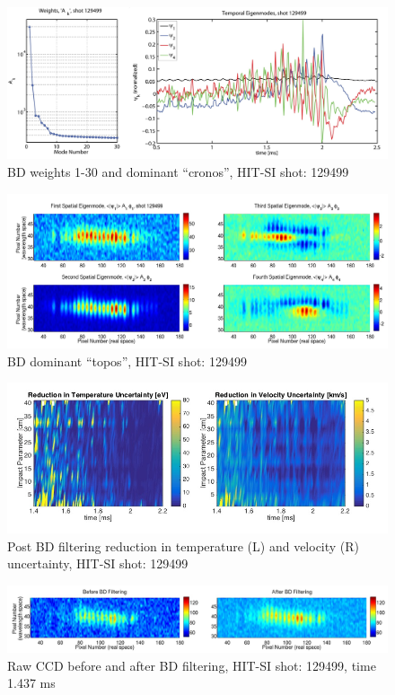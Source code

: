\documentclass{AIAA}
\begin{document}
\begin{center}
\begin{figure}
\includegraphics[width=6in]{BDWeight}\caption{BD weights 1-30 and dominant ``cronos'', HIT-SI shot: 129499}\label{BD Weight}
\end{figure}
\begin{figure}
\includegraphics[width=6in]{BDTopos}\caption{BD dominant ``topos'', HIT-SI shot: 129499}\label{BD Topos}
\end{figure}
\begin{figure}
\includegraphics[width=6in]{BD_Uncertainty}\caption{Post BD filtering reduction in temperature (L) and velocity (R) uncertainty, HIT-SI shot: 129499}\label{BD Uncertainty}
\end{figure}
\begin{figure}
\includegraphics[width=6in]{CCD_BD}\caption{Raw CCD before and after BD filtering, HIT-SI shot: 129499, time 1.437 ms}\label{BD CCD}


\end{figure}
\end{center}
\end{document}
